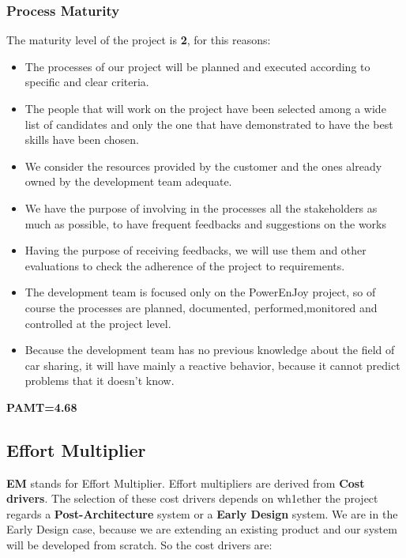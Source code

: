 \subsubsection{Process Maturity}
The maturity level of the project is \textbf{2}, for this reasons:

\begin{itemize}
	\item The processes of our project will be planned and executed according to specific and clear criteria. 
	\item The people that will work on the project have been selected among a wide list of candidates and only the one that have demonstrated to have the best skills have been chosen.
	\item We consider the resources provided by the customer and the ones already owned by the development team adequate.
	\item We have the purpose of involving in the processes all the stakeholders as much as possible, to have frequent feedbacks and suggestions on the works
	\item Having the purpose of receiving feedbacks, we will use them and other evaluations to check the adherence of the project to requirements.
	\item The development team is focused only on the PowerEnJoy project, so of course the processes are planned, documented, performed,monitored and controlled at the project level.
	\item Because the development team has no previous knowledge about the field of car sharing, it will have mainly a reactive behavior, because it cannot predict problems that it doesn't know.  
\end{itemize}  
\textbf{PAMT=4.68}

\pagebreak
\subsection{Effort Multiplier}
\textbf{EM} stands for Effort Multiplier. Effort multipliers are derived from \textbf{Cost drivers}. The selection of these cost drivers depends on wh1ether the project regards a \textbf{Post-Architecture} system or a \textbf{Early Design} system. We are in the Early Design case, because we are extending an existing product and our system will be developed from scratch. So the cost drivers are:

